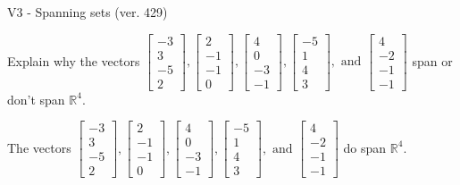 \begin{exercise}
  \begin{exerciseTitle}V3 - Spanning sets (ver. 429)\end{exerciseTitle}
  \begin{exerciseStatement}
    Explain why the vectors \(\left[\begin{array}{r}
-3 \\
3 \\
-5 \\
2
\end{array}\right] , \left[\begin{array}{r}
2 \\
-1 \\
-1 \\
0
\end{array}\right] , \left[\begin{array}{r}
4 \\
0 \\
-3 \\
-1
\end{array}\right] , \left[\begin{array}{r}
-5 \\
1 \\
4 \\
3
\end{array}\right] , \text{ and } \left[\begin{array}{r}
4 \\
-2 \\
-1 \\
-1
\end{array}\right]\) span or don't span \(\mathbb{R}^4\). 
	


  \end{exerciseStatement}
  \begin{exerciseAnswer}
   The vectors \(\left[\begin{array}{r}
-3 \\
3 \\
-5 \\
2
\end{array}\right] , \left[\begin{array}{r}
2 \\
-1 \\
-1 \\
0
\end{array}\right] , \left[\begin{array}{r}
4 \\
0 \\
-3 \\
-1
\end{array}\right] , \left[\begin{array}{r}
-5 \\
1 \\
4 \\
3
\end{array}\right] , \text{ and } \left[\begin{array}{r}
4 \\
-2 \\
-1 \\
-1
\end{array}\right]\) 
  	 do  
	span \(\mathbb{R}^4\).
  



\end{exerciseAnswer}
\end{exercise}
